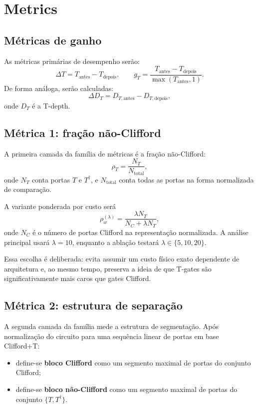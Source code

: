 \documentclass[a4paper,11pt]{article}
\begin{document}
\section{Metrics}

\subsection*{Métricas de ganho}

As métricas primárias de desempenho serão:
\[
\Delta T = T_{\text{antes}} - T_{\text{depois}},
\qquad
g_T = \frac{T_{\text{antes}} - T_{\text{depois}}}{\max(T_{\text{antes}},1)}.
\]
De forma análoga, serão calculadas:
\[
\Delta D_T = D_{T,\text{antes}} - D_{T,\text{depois}},
\]
onde $D_T$ é a T-depth.

\subsection*{Métrica 1: fração não-Clifford}

A primeira camada da família de métricas é a fração não-Clifford:
\[
\rho_T = \frac{N_T}{N_{\text{total}}},
\]
onde $N_T$ conta portas $T$ e $T^\dagger$, e $N_{\text{total}}$ conta todas as portas na forma normalizada de comparação.

A variante ponderada por custo será
\[
\rho_w^{(\lambda)} = \frac{\lambda N_T}{N_C + \lambda N_T},
\]
onde $N_C$ é o número de portas Clifford na representação normalizada. A análise principal usará $\lambda = 10$, enquanto a ablação testará $\lambda \in \{5,10,20\}$.

Essa escolha é deliberada: evita assumir um custo físico exato dependente de arquitetura e, ao mesmo tempo, preserva a ideia de que T-gates são significativamente mais caros que gates Clifford.

\subsection*{Métrica 2: estrutura de separação}

A segunda camada da família mede a estrutura de segmentação. Após normalização do circuito para uma sequência linear de portas em base Clifford+T:
\begin{itemize}
  \item define-se \textbf{bloco Clifford} como um segmento maximal de portas do conjunto Clifford;
  \item define-se \textbf{bloco não-Clifford} como um segmento maximal de portas do conjunto $\{T,T^\dagger\}$.
\end{itemize}
\end{document}
